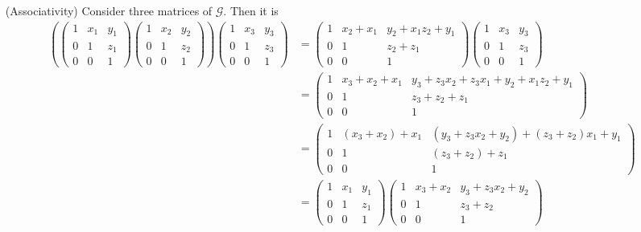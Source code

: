 \documentclass[solution]{tudexercise}
\begin{document}
\begin{itemize}
				\item[(Associativity)]
					Consider three matrices of $\mathcal{G}$. Then it is
					\begin{align*}
\left(\begin{pmatrix}
1 & x_1 & y_1\\
0 & 1 & z_1\\
0 & 0 & 1
\end{pmatrix}\begin{pmatrix}
1 & x_2 & y_2\\
0 & 1 & z_2\\
0 & 0 & 1
\end{pmatrix}\right)\begin{pmatrix}
1 & x_3 & y_3\\
0 & 1 & z_3\\
0 & 0 & 1
\end{pmatrix} &= \begin{pmatrix}
1 & x_2 + x_1 & y_2 + x_1z_2 + y_1\\
0 & 1 & z_2 + z_1\\
0 & 0 & 1
\end{pmatrix}\begin{pmatrix}
1 & x_3 & y_3\\
0 & 1 & z_3\\
0 & 0 & 1
\end{pmatrix}\\
&= \begin{pmatrix}
1 & x_3 + x_2 + x_1 & y_3 + z_3x_2 + z_3x_1 + y_2 + x_1z_2 + y_1\\
0 & 1 & z_3 + z_2 + z_1\\
0 & 0 & 1
\end{pmatrix}\\
&= \begin{pmatrix}
1 & (x_3 + x_2) + x_1 & (y_3 + z_3x_2 + y_2) + (z_3 + z_2)x_1 + y_1\\
0 & 1 & (z_3 + z_2) + z_1\\
0 & 0 & 1
\end{pmatrix}\\
&= \begin{pmatrix}
1 & x_1 & y_1\\
0 & 1 & z_1\\
0 & 0 & 1
\end{pmatrix}\begin{pmatrix}
1 & x_3 + x_2 & y_3 + z_3x_2 + y_2\\
0 & 1 & z_3 + z_2\\
0 & 0 & 1
\end{pmatrix}\\

\end{align*}
\end{itemize}
\end{document}
